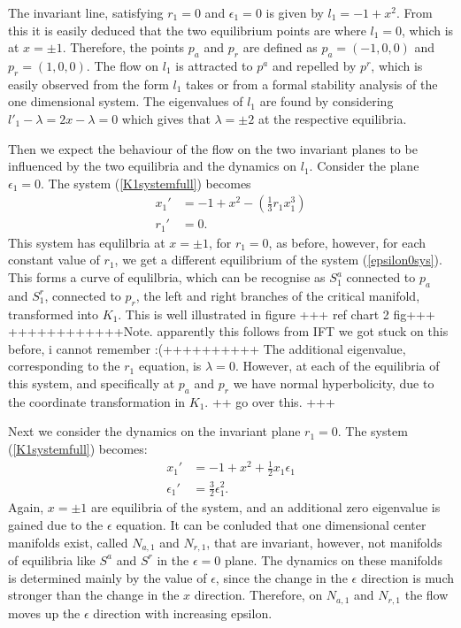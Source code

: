 The invariant line, satisfying $r_1=0$ and $\epsilon_1=0$ is given by $l_1= -1 +x^2$. 
From this it is easily deduced that the two equilibrium points are where $l_1=0$, which is at $x=\pm1$. Therefore, the points $p_a$ and $p_r$ are defined as $p_a= (-1,0,0)$ and $p_r=(1,0,0)$.
The flow on $l_1$ is attracted to $p^a$ and repelled by $p^r$, which is easily observed from the form $l_1$ takes or from a formal stability analysis of the one dimensional system. The eigenvalues of $l_1$ are found  by considering $l'_1 - \lambda = 2x - \lambda= 0 $ which gives that $\lambda = \pm 2$ at the respective equilibria.
 
Then we expect the behaviour of the flow on the two invariant planes to be influenced by the two equilibria and the dynamics on $l_1$.
Consider the plane $\epsilon_1=0$. The system (\ref{K1systemfull}) becomes
\begin{align} \label{epsilon0sys}
x_1' &= -1 +x^2 - \left( \frac{1}{3}r_1x_1^3 \right)\\
r_1' &= 0.
\end{align}
This system has equlilbria at $x= \pm1$, for $r_1=0$, as before, however, for each constant value of $r_1$, we get a different equilibrium of the system (\ref{epsilon0sys}). This forms a curve of equlilbria, which can be recognise as $S^a_1$ connected to $p_a$ and $S^r_1$, connected to $p_r$, the left and right branches of the critical manifold, transformed into $K_1$. This is well illustrated in figure +++ ref chart 2 fig+++
++++++++++++Note. apparently this follows from IFT we got stuck on this before, i cannot remember :(++++++++++
The additional eigenvalue, corresponding to the $r_1$ equation, is $\lambda=0$. However, at each of the equilibria of this system, and specifically at $p_a$ and $p_r$ we have normal hyperbolicity, due to the coordinate transformation in $K_1$. ++ go over this. +++

Next we consider the dynamics on the invariant plane $r_1=0$.
The system (\ref{K1systemfull}) becomes: 
\begin{align}
x_1' &= -1 +x^2 + \frac{1}{2} x_1 \epsilon_1 \\
\epsilon_1' &= \frac{3}{2} \epsilon_1^2 .
\end{align}
Again, $x= \pm 1$ are equilibria of the system, and an additional zero eigenvalue is gained due to the $\epsilon$ equation. It can be conluded that one dimensional center manifolds exist, called $N_{a,1}$ and $N_{r,1}$, that are invariant, however, not manifolds of equilibria like $S^a$ and $S^r$ in the $\epsilon=0$ plane. The dynamics on these manifolds is determined mainly by the value of $\epsilon$, since the change in the $\epsilon$ direction is much stronger than the change in the $x$ direction. Therefore, on $N_{a,1}$ and $N_{r,1}$ the flow moves up the $\epsilon$ direction with increasing epsilon.

